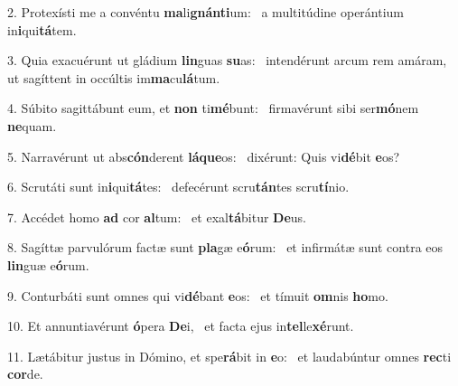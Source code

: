 2. Protexísti me a convéntu \textbf{ma}li\textbf{gnán}\textbf{ti}um: \ast\  a multitúdine operántium in\textbf{i}qui\textbf{tá}tem.\

3. Quia exacuérunt ut gládium \textbf{lin}guas \textbf{su}as: \ast\  intendérunt arcum rem amáram, ut sagíttent in occúltis im\textbf{ma}cu\textbf{lá}tum.\

4. Súbito sagittábunt eum, et \textbf{non} ti\textbf{mé}bunt: \ast\  firmavérunt sibi ser\textbf{mó}nem \textbf{ne}quam.\

5. Narravérunt ut abs\textbf{cón}derent \textbf{lá}\textbf{que}os: \ast\  dixérunt: Quis vi\textbf{dé}bit \textbf{e}os?\

6. Scrutáti sunt in\textbf{i}qui\textbf{tá}tes: \ast\  defecérunt scru\textbf{tán}tes scru\textbf{tí}nio.\

7. Accédet homo \textbf{ad} cor \textbf{al}tum: \ast\  et exal\textbf{tá}bitur \textbf{De}us.\

8. Sagíttæ parvulórum factæ sunt \textbf{pla}gæ e\textbf{ó}rum: \ast\  et infirmátæ sunt contra eos \textbf{lin}guæ e\textbf{ó}rum.\

9. Conturbáti sunt omnes qui vi\textbf{dé}bant \textbf{e}os: \ast\  et tímuit \textbf{om}nis \textbf{ho}mo.\

10. Et annuntiavérunt \textbf{ó}pera \textbf{De}i, \ast\  et facta ejus in\textbf{tel}le\textbf{xé}runt.\

11. Lætábitur justus in Dómino, et spe\textbf{rá}bit in \textbf{e}o: \ast\  et laudabúntur omnes \textbf{rec}ti \textbf{cor}de.\

